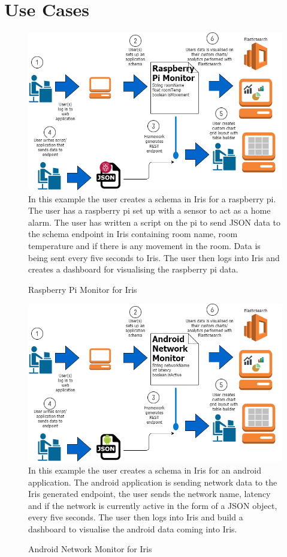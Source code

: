 \documentclass[12pt,a4paper,titlepage]{report}
\begin{document}
\section{Use Cases}
\begin{figure}[H]
\begin{tcolorbox}
\includegraphics[width=\textwidth,height=\textheight,keepaspectratio]{dynamic_performance_framework_pi_flow}
In this example the user creates a schema in Iris for a raspberry pi. The user has a raspberry pi set up with a sensor to act as a home alarm. The user has written a script on the pi to send JSON data to the schema endpoint in Iris containing room name, room temperature and if there is any movement in the room. Data is being sent every five seconds to Iris. The user then logs into Iris and creates a dashboard for visualising the raspberry pi data.
\end{tcolorbox}
\caption{Raspberry Pi Monitor for Iris}
\end{figure}
\begin{figure}[H]
\begin{tcolorbox}
\includegraphics[width=\textwidth,height=\textheight,keepaspectratio]{dynamic_performance_framework_android_flow}
In this example the user creates a schema in Iris for an android application. The android application is sending network data to the Iris generated endpoint, the user sends the network name, latency and if the network is currently active in the form of a JSON object, every five seconds. The user then logs into Iris and build a dashboard to visualise the android data coming into Iris.
\end{tcolorbox}
\caption{Android Network Monitor for Iris}
\end{figure}
\end{document}
